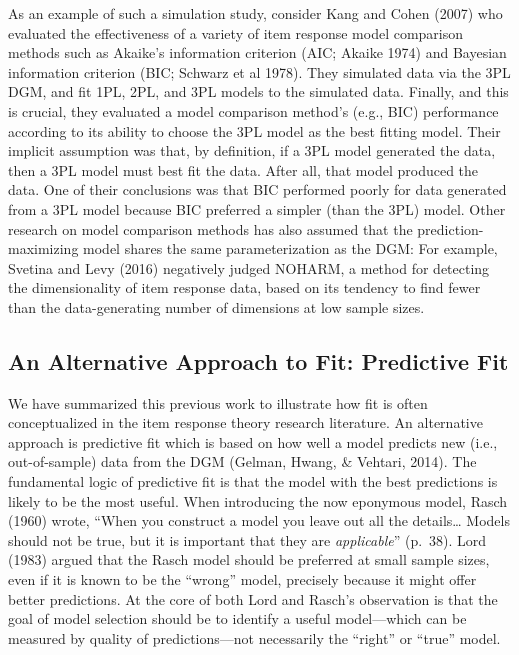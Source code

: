 \documentclass[
  english,
  man,floatsintext]{apa7}
\begin{document}
As an example of such a simulation study, consider Kang and Cohen (2007) who evaluated the effectiveness of a variety of item response model comparison methods such as Akaike's information criterion (AIC; Akaike 1974) and Bayesian information criterion (BIC; Schwarz et al 1978). They simulated data via the 3PL DGM, and fit 1PL, 2PL, and 3PL models to the simulated data. Finally, and this is crucial, they evaluated a model comparison method's (e.g., BIC) performance according to its ability to choose the 3PL model as the best fitting model. Their implicit assumption was that, by definition, if a 3PL model generated the data, then a 3PL model must best fit the data. After all, that model produced the data. One of their conclusions was that BIC performed poorly for data generated from a 3PL model because BIC preferred a simpler (than the 3PL) model. Other research on model comparison methods has also assumed that the prediction-maximizing model shares the same parameterization as the DGM: For example, Svetina and Levy (2016) negatively judged NOHARM, a method for detecting the dimensionality of item response data, based on its tendency to find fewer than the data-generating number of dimensions at low sample sizes.

\hypertarget{an-alternative-approach-to-fit-predictive-fit}{%
\subsection{An Alternative Approach to Fit: Predictive Fit}\label{an-alternative-approach-to-fit-predictive-fit}}

We have summarized this previous work to illustrate how fit is often conceptualized in the item response theory research literature. An alternative approach is predictive fit which is based on how well a model predicts new (i.e., out-of-sample) data from the DGM (Gelman, Hwang, \& Vehtari, 2014). The fundamental logic of predictive fit is that the model with the best predictions is likely to be the most useful. When introducing the now eponymous model, Rasch (1960) wrote, ``When you construct a model you leave out all the details\ldots{} Models should not be true, but it is important that they are \emph{applicable}'' (p.~38). Lord (1983) argued that the Rasch model should be preferred at small sample sizes, even if it is known to be the ``wrong'' model, precisely because it might offer better predictions. At the core of both Lord and Rasch's observation is that the goal of model selection should be to identify a useful model---which can be measured by quality of predictions---not necessarily the ``right'' or ``true'' model.
\end{document}
